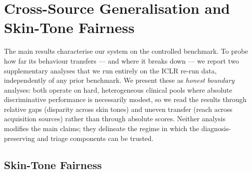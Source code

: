 
\section{Cross-Source Generalisation and Skin-Tone Fairness}\label{app:gen-fair}

The main results characterise our system on the controlled \itb benchmark. To probe how far its
behaviour transfers --- and where it breaks down --- we report two supplementary analyses that we run
entirely on the ICLR re-run data, independently of any prior benchmark. We present these as
\emph{honest boundary} analyses: both operate on hard, heterogeneous clinical pools where absolute
discriminative performance is necessarily modest, so we read the results through relative gaps
(disparity across skin tones) and uneven transfer (reach across acquisition sources) rather than
through absolute scores. Neither analysis modifies the main claims; they delineate the regime in
which the diagnosis-preserving and triage components can be trusted.

\subsection{Skin-Tone Fairness}\label{app:fairness}

